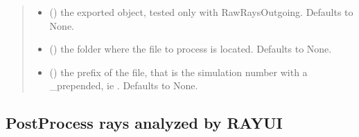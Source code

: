 \documentclass[letterpaper,10pt,english]{sphinxmanual}
\begin{document}
\begin{fulllineitems}
\begin{fulllineitems}
\begin{quote}
\begin{description}
\begin{itemize}
\item {} 
\sphinxAtStartPar
{} (\sphinxstyleliteralemphasis{\sphinxupquote{, }}) \textendash{} the exported object, tested only with RawRaysOutgoing. Defaults to None.

\item {} 
\sphinxAtStartPar
{} (\sphinxstyleliteralemphasis{\sphinxupquote{, }}) \textendash{} the folder where the file to process is located. Defaults to None.

\item {} 
\sphinxAtStartPar
{} (\sphinxstyleliteralemphasis{\sphinxupquote{, }}) \textendash{} the prefix of the file, that is the simulation number with a \_prepended, ie . Defaults to None.

\end{itemize}

\end{description}\end{quote}

\end{fulllineitems}


\end{fulllineitems}



\subsection{PostProcess rays analyzed by RAY\sphinxhyphen{}UI}
\label{\detokenize{API:postprocess-rays-analyzed-by-ray-ui}}
\end{document}

